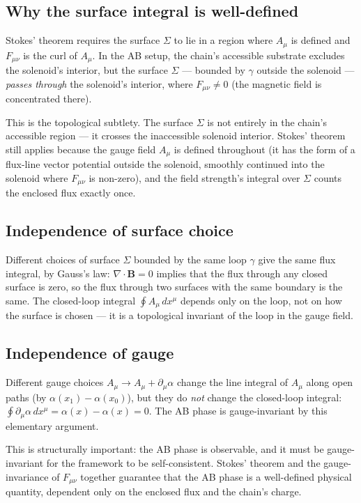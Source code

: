 \documentclass[11pt,a4paper]{article}
\begin{document}
\subsection{Why the surface integral is well-defined}

Stokes' theorem requires the surface $\Sigma$ to lie in a region where $A_\mu$ is defined and $F_{\mu\nu}$ is the curl of $A_\mu$. In the AB setup, the chain's accessible substrate excludes the solenoid's interior, but the surface $\Sigma$ --- bounded by $\gamma$ outside the solenoid --- \emph{passes through} the solenoid's interior, where $F_{\mu\nu} \neq 0$ (the magnetic field is concentrated there).

This is the topological subtlety. The surface $\Sigma$ is not entirely in the chain's accessible region --- it crosses the inaccessible solenoid interior. Stokes' theorem still applies because the gauge field $A_\mu$ is defined throughout (it has the form of a flux-line vector potential outside the solenoid, smoothly continued into the solenoid where $F_{\mu\nu}$ is non-zero), and the field strength's integral over $\Sigma$ counts the enclosed flux exactly once.

\subsection{Independence of surface choice}

Different choices of surface $\Sigma$ bounded by the same loop $\gamma$ give the same flux integral, by Gauss's law: $\nabla \cdot \mathbf{B} = 0$ implies that the flux through any closed surface is zero, so the flux through two surfaces with the same boundary is the same. The closed-loop integral $\oint A_\mu \, dx^\mu$ depends only on the loop, not on how the surface is chosen --- it is a topological invariant of the loop in the gauge field.

\subsection{Independence of gauge}

Different gauge choices $A_\mu \to A_\mu + \partial_\mu \alpha$ change the line integral of $A_\mu$ along open paths (by $\alpha(x_1) - \alpha(x_0)$), but they do \emph{not} change the closed-loop integral: $\oint \partial_\mu \alpha \, dx^\mu = \alpha(x) - \alpha(x) = 0$. The AB phase is gauge-invariant by this elementary argument.

This is structurally important: the AB phase is observable, and it must be gauge-invariant for the framework to be self-consistent. Stokes' theorem and the gauge-invariance of $F_{\mu\nu}$ together guarantee that the AB phase is a well-defined physical quantity, dependent only on the enclosed flux and the chain's charge.
\end{document}
